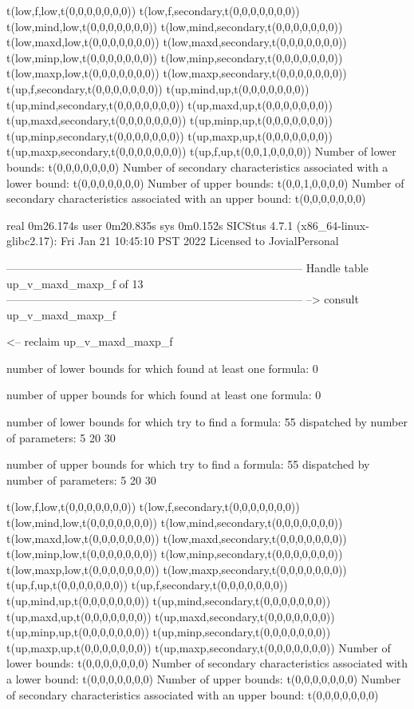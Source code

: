 t(low,f,low,t(0,0,0,0,0,0,0))
t(low,f,secondary,t(0,0,0,0,0,0,0))
t(low,mind,low,t(0,0,0,0,0,0,0))
t(low,mind,secondary,t(0,0,0,0,0,0,0))
t(low,maxd,low,t(0,0,0,0,0,0,0))
t(low,maxd,secondary,t(0,0,0,0,0,0,0))
t(low,minp,low,t(0,0,0,0,0,0,0))
t(low,minp,secondary,t(0,0,0,0,0,0,0))
t(low,maxp,low,t(0,0,0,0,0,0,0))
t(low,maxp,secondary,t(0,0,0,0,0,0,0))
t(up,f,secondary,t(0,0,0,0,0,0,0))
t(up,mind,up,t(0,0,0,0,0,0,0))
t(up,mind,secondary,t(0,0,0,0,0,0,0))
t(up,maxd,up,t(0,0,0,0,0,0,0))
t(up,maxd,secondary,t(0,0,0,0,0,0,0))
t(up,minp,up,t(0,0,0,0,0,0,0))
t(up,minp,secondary,t(0,0,0,0,0,0,0))
t(up,maxp,up,t(0,0,0,0,0,0,0))
t(up,maxp,secondary,t(0,0,0,0,0,0,0))
t(up,f,up,t(0,0,1,0,0,0,0))
Number of lower bounds:                                             t(0,0,0,0,0,0,0)
Number of secondary characteristics associated with a lower bound:  t(0,0,0,0,0,0,0)
Number of upper bounds:                                             t(0,0,1,0,0,0,0)
Number of secondary characteristics associated with an upper bound: t(0,0,0,0,0,0,0)

real	0m26.174s
user	0m20.835s
sys	0m0.152s
SICStus 4.7.1 (x86_64-linux-glibc2.17): Fri Jan 21 10:45:10 PST 2022
Licensed to JovialPersonal


--------------------------------------------------------------------------------
Handle table up_v_maxd_maxp_f of 13
--------------------------------------------------------------------------------
--> consult up_v_maxd_maxp_f

<-- reclaim up_v_maxd_maxp_f

number of lower bounds for which found at least one formula: 0

number of upper bounds for which found at least one formula: 0

number of lower bounds for which try to find a formula: 55
dispatched by number of parameters: 5  20  30

number of upper bounds for which try to find a formula: 55
dispatched by number of parameters: 5  20  30

t(low,f,low,t(0,0,0,0,0,0,0))
t(low,f,secondary,t(0,0,0,0,0,0,0))
t(low,mind,low,t(0,0,0,0,0,0,0))
t(low,mind,secondary,t(0,0,0,0,0,0,0))
t(low,maxd,low,t(0,0,0,0,0,0,0))
t(low,maxd,secondary,t(0,0,0,0,0,0,0))
t(low,minp,low,t(0,0,0,0,0,0,0))
t(low,minp,secondary,t(0,0,0,0,0,0,0))
t(low,maxp,low,t(0,0,0,0,0,0,0))
t(low,maxp,secondary,t(0,0,0,0,0,0,0))
t(up,f,up,t(0,0,0,0,0,0,0))
t(up,f,secondary,t(0,0,0,0,0,0,0))
t(up,mind,up,t(0,0,0,0,0,0,0))
t(up,mind,secondary,t(0,0,0,0,0,0,0))
t(up,maxd,up,t(0,0,0,0,0,0,0))
t(up,maxd,secondary,t(0,0,0,0,0,0,0))
t(up,minp,up,t(0,0,0,0,0,0,0))
t(up,minp,secondary,t(0,0,0,0,0,0,0))
t(up,maxp,up,t(0,0,0,0,0,0,0))
t(up,maxp,secondary,t(0,0,0,0,0,0,0))
Number of lower bounds:                                             t(0,0,0,0,0,0,0)
Number of secondary characteristics associated with a lower bound:  t(0,0,0,0,0,0,0)
Number of upper bounds:                                             t(0,0,0,0,0,0,0)
Number of secondary characteristics associated with an upper bound: t(0,0,0,0,0,0,0)

